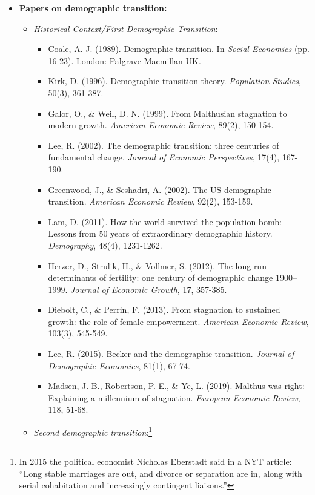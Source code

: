 \documentclass{article}
\begin{document}
\begin{itemize}
\item \textbf{Papers on demographic transition:}
\begin{itemize}
\item \textit{Historical Context/First Demographic Transition}:
\begin{itemize}
\item Coale, A. J. (1989). Demographic transition. In \textit{Social Economics} (pp. 16-23). London: Palgrave Macmillan UK.
\item Kirk, D. (1996). Demographic transition theory. \textit{Population Studies}, 50(3), 361-387.
\item Galor, O., \& Weil, D. N. (1999). From Malthusian stagnation to modern growth. \textit{American Economic Review}, 89(2), 150-154.
\item Lee, R. (2002). The demographic transition: three centuries of fundamental change. \textit{Journal of Economic Perspectives}, 17(4), 167-190.
\item Greenwood, J., \& Seshadri, A. (2002). The US demographic transition. \textit{American Economic Review}, 92(2), 153-159.
\item Lam, D. (2011). How the world survived the population bomb: Lessons from 50 years of extraordinary demographic history. \textit{Demography}, 48(4), 1231-1262.
\item Herzer, D., Strulik, H., \& Vollmer, S. (2012). The long-run determinants of fertility: one century of demographic change 1900–1999. \textit{Journal of Economic Growth}, 17, 357-385.
\item Diebolt, C., \& Perrin, F. (2013). From stagnation to sustained growth: the role of female empowerment. \textit{American Economic Review}, 103(3), 545-549.
\item Lee, R. (2015). Becker and the demographic transition. \textit{Journal of Demographic Economics}, 81(1), 67-74.
\item Madsen, J. B., Robertson, P. E., \& Ye, L. (2019). Malthus was right: Explaining a millennium of stagnation. \textit{European Economic Review}, 118, 51-68.
\end{itemize}

\item \textit{Second demographic transition}:\footnote{In 2015 the political economist Nicholas Eberstadt said in a NYT article: ``Long stable marriages are out, and divorce or separation are in, along with serial cohabitation and increasingly contingent liaisons.''}


\end{itemize}
\end{itemize}
\end{document}
